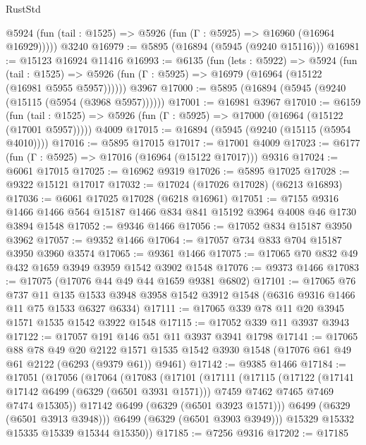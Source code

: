 \begin{lexlean}{RustStd}
\begin{coremodule}
{{      @5924 (fun (tail : @1525) => @5926 (fun (Γ : @5925) => @16960 (@16964 @16929)))))
    @3240
@16979 := @5895 (@16894 (@5945 (@9240 @15116)))
@16981 := @15123 @16924 @11416
@16993 := @6135
    (fun (lets : @5922) =>
    @5924
      (fun (tail : @1525) =>
      @5926 (fun (Γ : @5925) => @16979 (@16964 (@15122 (@16981 @5955 @5957))))))
    @3967
@17000 := @5895 (@16894 (@5945 (@9240 (@15115 (@5954 (@3968 @5957))))))
@17001 := @16981 @3967
@17010 := @6159
    (fun (tail : @1525) => @5926 (fun (Γ : @5925) => @17000 (@16964 (@15122 (@17001 @5957)))))
    @4009
@17015 := @16894 (@5945 (@9240 (@15115 (@5954 @4010))))
@17016 := @5895 @17015
@17017 := @17001 @4009
@17023 := @6177 (fun (Γ : @5925) => @17016 (@16964 (@15122 @17017))) @9316
@17024 := @6061 @17015
@17025 := @16962 @9319
@17026 := @5895 @17025
@17028 := @9322 @15121 @17017
@17032 := @17024 (@17026 @17028) (@6213 @16893)
@17036 := @6061 @17025 @17028 (@6218 @16961)
@17051 := @7155
    @9316
    @1466
    @1466
    @564
    @15187
    @1466
    @834
    @841
    @15192
    @3964
    @4008
    @46
    @1730
    @3894
    @1548
@17052 := @9346 @1466
@17056 := @17052 @834 @15187 @3950 @3962
@17057 := @9352 @1466
@17064 := @17057 @734 @833 @704 @15187 @3950 @3960 @3574
@17065 := @9361 @1466
@17075 := @17065 @70 @832 @49 @432 @1659 @3949 @3959 @1542 @3902 @1548
@17076 := @9373 @1466
@17083 := @17075 (@17076 @44 @49 @44 @1659 @9381 @6802)
@17101 := @17065
    @76
    @737
    @11
    @135
    @1533
    @3948
    @3958
    @1542
    @3912
    @1548
    (@6316 @9316 @1466 @11 @75 @1533 @6327 @6334)
@17111 := @17065 @339 @78 @11 @20 @3945 @1571 @1535 @1542 @3922 @1548
@17115 := @17052 @339 @11 @3937 @3943
@17122 := @17057 @191 @146 @51 @11 @3937 @3941 @1798
@17141 := @17065
    @88
    @78
    @49
    @20
    @2122
    @1571
    @1535
    @1542
    @3930
    @1548
    (@17076 @61 @49 @61 @2122 (@6293 (@9379 @61)) @9461)
@17142 := @9385 @1466
@17184 := @17051
    (@17056
      (@17064
        (@17083
          (@17101
            (@17111
              (@17115
                (@17122
                  (@17141 @17142 @6499 (@6329 (@6501 @3931 @1571)))
                  @7459
                  @7462
                  @7465
                  @7469
                  @7474
                  @15305))
              @17142
              @6499
              (@6329 (@6501 @3923 @1571)))
            @6499
            (@6329 (@6501 @3913 @3948)))
          @6499
          (@6329 (@6501 @3903 @3949)))
        @15329
        @15332
        @15335
        @15339
        @15344
        @15350))
@17185 := @7256 @9316
@17202 := @17185
}}
\end{coremodule}
\end{lexlean}
